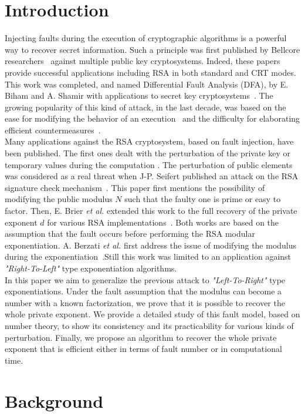 \documentclass{article}
\begin{document}
\section{Introduction}
Injecting faults during the execution of cryptographic algorithms is a powerful way to recover secret information.
Such a principle was first published by Bellcore researchers~\cite{20,21} against multiple public key cryptosystems. Indeed, these papers provide successful applications including RSA in both standard and CRT modes.
This work was completed, and named Differential Fault Analysis (DFA), by E. Biham and A. Shamir with applications to secret key cryptosystems~\cite{22}. The growing popularity of this kind of attack, in the last decade, was based on the ease for modifying the behavior of an execution~\cite{12} and the difficulty for elaborating efficient countermeasures~\cite{40,43,32}.\\
\indent
Many applications against the RSA cryptosystem, based on fault
injection, have been published. The first ones dealt with the perturbation
of the private key or temporary values during the computation
\cite{20,19,21}. The perturbation of public elements  was considered
as a real threat when J-P. Seifert published an attack on the RSA
signature check mechanism~\cite{67,13}. This paper first mentions the
possibility of modifying the public modulus $N$ such that the faulty
one is prime or easy to factor. Then, E. Brier \textit{et al.}
extended this work to the full recovery of the private exponent $d$
for various RSA implementations~\cite{6}. Both works are based on the
assumption that the fault occurs before performing the RSA modular
exponentiation. A. Berzati \textit{et al.} first address the issue of
modifying the modulus during the exponentiation~\cite{77}.Still this
work was limited to an application against \textit{"Right-To-Left"}
type exponentiation algorithms.\\
\indent
In this paper we aim to generalize the previous attack to
\textit{"Left-To-Right"} type exponentiations. Under the fault
assumption that the modulus can become a number with a known
factorization, we prove that it is possible to recover the whole
private exponent. We provide a detailed study of this fault model,
based on number theory, to show its consistency and its practicability
for various kinds of perturbation. Finally, we propose an algorithm to
recover the whole private exponent that is efficient either in terms
of fault number or in computational time. 

\section{Background}
\end{document}
